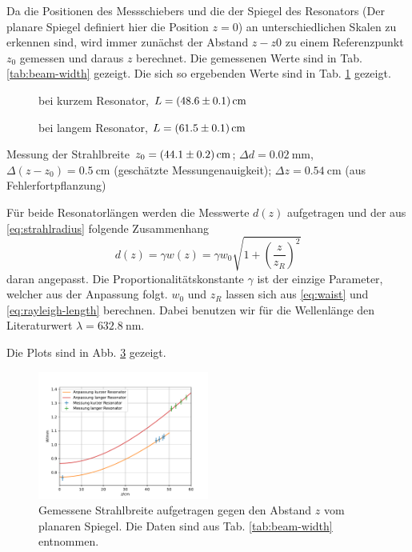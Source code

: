 \documentclass{article}
\newcommand*{\tablePath}{../data} %
\begin{document}
Da die Positionen des Messschiebers und die der Spiegel des
Resonators (Der planare Spiegel definiert hier die Position $z=0$) an unterschiedlichen Skalen zu erkennen sind,
wird immer zunächst der Abstand $z-z0$ zu einem Referenzpunkt $z_0$ gemessen und daraus $z$ berechnet.
Die gemessenen Werte sind in Tab. \ref{tab:beam-width} gezeigt.
Die sich so ergebenden Werte sind in Tab. \ref{tab:beam-width-short} gezeigt.
\begin{table}
  \centering
  \begin{subfigure}{0.42\textwidth}
    \centering
    
    \caption{
      bei kurzem Resonator,
      $L=\SI{48.6\pm0.1}{\cm}$}
    \label{tab:beam-width-short}
  \end{subfigure}
  \hfill
  \begin{subfigure}{0.42\textwidth}
    \centering
    
    \caption{
      bei langem Resonator,
      $L=\SI{61.5\pm0.1}{\cm}$}
    \label{tab:beam-width-long}
  \end{subfigure}
  \caption{
    Messung der Strahlbreite
    $z_0=\SI{44.1\pm0.2}{\cm}$;
    $\Delta d = \SI{0.02}{\mm}$,
    $\Delta (z-z_0) = \SI{0.5}{\cm}$ (geschätzte Messungenauigkeit);
    $\Delta z=\SI{0.54}{\cm}$ (aus Fehlerfortpflanzung)}
  \label{tab:beam-width}
\end{table}

Für beide Resonatorlängen werden die Messwerte $d(z)$ aufgetragen und der aus \eqref{eq:strahlradius} folgende Zusammenhang
\begin{equation}
  d(z) = \gamma w(z) = \gamma w_0 \sqrt{1+\left( \frac{z}{z_R} \right)^2} \label{eq:strahlbreite}
\end{equation}
daran angepasst. Die Proportionalitätskonstante $\gamma$ ist der einzige Parameter, welcher aus der Anpassung folgt.
$w_0$ und $z_R$ lassen sich aus \eqref{eq:waist} und \eqref{eq:rayleigh-length} berechnen. Dabei benutzen wir für die Wellenlänge
den Literaturwert $\lambda=\SI{632.8}{\nm}$.

Die Plots sind in Abb. \ref{fig:beam-width} gezeigt.
\begin{figure}[h]
  \centering
  \includegraphics[width=0.5\textwidth]{5.5beamB}
  \caption{
    Gemessene Strahlbreite aufgetragen gegen den Abstand $z$ vom planaren Spiegel.
    Die Daten sind aus Tab. \ref{tab:beam-width} entnommen.
  }
  \label{fig:beam-width}
\end{figure}
\end{document}
